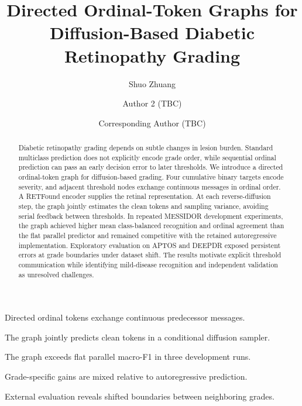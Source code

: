 \documentclass[a4paper,fleqn]{cas-sc}
\begin{document}
\let\WriteBookmarks\relax
\def\floatpagepagefraction{1}
\def\textpagefraction{.001}

\title[mode=title]{Directed Ordinal-Token Graphs for Diffusion-Based Diabetic Retinopathy Grading}

\author[aff1]{Shuo Zhuang}
\author[aff1]{Author 2 (TBC)}
\author[aff2]{Corresponding Author (TBC)}
\cormark[1]

\begin{abstract}
Diabetic retinopathy grading depends on subtle changes in lesion burden. Standard multiclass prediction does not explicitly encode grade order, while sequential ordinal prediction can pass an early decision error to later thresholds. We introduce a directed ordinal-token graph for diffusion-based grading. Four cumulative binary targets encode severity, and adjacent threshold nodes exchange continuous messages in ordinal order. A RETFound encoder supplies the retinal representation. At each reverse-diffusion step, the graph jointly estimates the clean tokens and sampling variance, avoiding serial feedback between thresholds. In repeated MESSIDOR development experiments, the graph achieved higher mean class-balanced recognition and ordinal agreement than the flat parallel predictor and remained competitive with the retained autoregressive implementation. Exploratory evaluation on APTOS and DEEPDR exposed persistent errors at grade boundaries under dataset shift. The results motivate explicit threshold communication while identifying mild-disease recognition and independent validation as unresolved challenges.
\end{abstract}

\begin{highlights}
\item Directed ordinal tokens exchange continuous predecessor messages.
\item The graph jointly predicts clean tokens in a conditional diffusion sampler.
\item The graph exceeds flat parallel macro-F1 in three development runs.
\item Grade-specific gains are mixed relative to autoregressive prediction.
\item External evaluation reveals shifted boundaries between neighboring grades.
\end{highlights}
\end{document}
